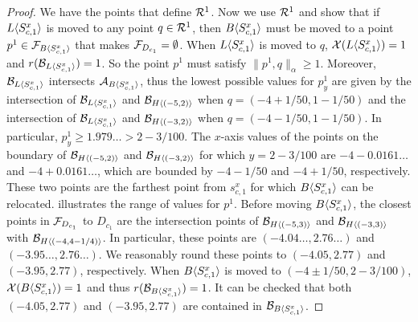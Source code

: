 \begin{toappendix}
\begin{toappendix}
\begin{proof}
    We have the points that define $\mathcal{R}^1$. 
    Now we use $\mathcal{R}^1$ and show that if $L\langle S^x_{c,1}\rangle$ is moved to any point $q\in \mathcal{R}^1$, then $B\langle S^x_{c,1}\rangle$ must be moved to a point $p^1 \in \mathcal{F}_{B\langle S^x_{c,1}\rangle}$ that makes $\mathcal{F}_{D_{c_1}} = \emptyset$.
    When $L\langle S^x_{c,1}\rangle$ is moved to $q$, $\mathcal{X}(L\langle S^x_{c,1}\rangle) = 1$ and $r(\mathcal{B}_{L\langle S^x_{c,1}\rangle}) =1$. 
    So the point $p^1$ must satisfy $\lVert p^1,q\rVert_\alpha \ge 1$.
    Moreover, $\mathcal{B}_{L\langle S^x_{c,1}\rangle}$ intersects $\mathcal{A}_{B\langle S^x_{c,1}\rangle}$, thus the lowest possible values for $p^1_y$ are given by the intersection of $\mathcal{B}_{L\langle S^x_{c,1}\rangle}$ and $\mathcal{B}_{H\langle (-5,2)\rangle}$ when $q = (-4+1/50,1-1/50)$ and the intersection of $\mathcal{B}_{L\langle S^x_{c,1}\rangle}$ and $\mathcal{B}_{H\langle (-3,2)\rangle}$ when $q = (-4-1/50,1-1/50)$.
    In particular, $p^1_y \ge 1.979\ldots > 2-3/100$.
    The $x$-axis values of the points on the boundary of $\mathcal{B}_{H\langle (-5,2)\rangle}$ and $\mathcal{B}_{H\langle (-3,2)\rangle}$ for which $y = 2-3/100$ are $-4- 0.0161\ldots$ and $-4+0.0161\ldots$, which are bounded by $-4- 1/50$ and $-4+ 1/50$, respectively.
    These two points are the farthest point from $s^x_{c,1}$ for which $B\langle S^x_{c,1}\rangle$ can be relocated.
     illustrates the range of values for $p^1$.
    Before moving $B\langle S^x_{c,1}\rangle$, the closest points in $\mathcal{F}_{D_{c_1}}$ to $D_{c_1}$ are the intersection points of $\mathcal{B}_{H\langle (-5,3)\rangle}$ and $\mathcal{B}_{H\langle (-3,3)\rangle}$ with $\mathcal{B}_{H\langle (-4,4-1/4)\rangle}$. 
    In particular, these points are $(-4.04\ldots,2.76\ldots)$ and $(-3.95\ldots,2.76\ldots)$.
    We reasonably round these points to $(-4.05,2.77)$ and $(-3.95,2.77)$, respectively.
    When $B\langle S^x_{c,1}\rangle$ is moved to $(-4\pm 1/50, 2-3/100)$, 
    $\mathcal{X}(B\langle S^x_{c,1}\rangle) = 1$ and thus $r(\mathcal{B}_{B\langle S^x_{c,1}\rangle}) = 1$. 
    It can be checked that both $(-4.05,2.77)$ and $(-3.95,2.77)$ are contained in $\mathcal{B}_{B\langle S^x_{c,1}\rangle}$.

\end{proof}
\end{toappendix}
\end{toappendix}
